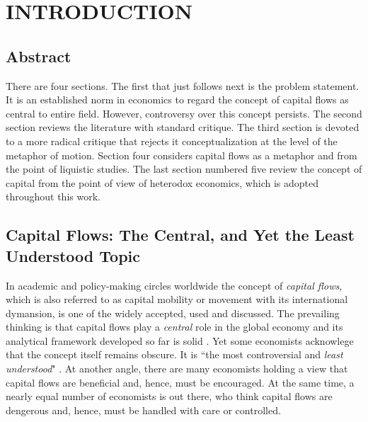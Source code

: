 \newpage

\section{\uppercase{Introduction}}\label{sec:intro}

\subsection*{Abstract}

There are four sections. The first that just follows next is the problem statement. It is an established norm in economics to regard the concept of capital flows as central to entire field. However, controversy over this concept persists. The second section reviews the literature with standard critique. The third section is devoted to a more radical critique that rejects it conceptualization at the level of the metaphor of motion. Section four considers capital flows as a metaphor and from the point of liquistic studies. The last section numbered five review the concept of capital from the point of view of heterodox economics, which is adopted throughout this work.      

\subsection{Capital Flows: The Central, and Yet the Least Understood Topic}

In academic and policy-making circles worldwide the concept of \textit{capital flows}, which is also referred to as capital mobility or movement with its international dymansion, is one of the widely accepted, used and discussed. The prevailing thinking is that capital flows play a \textit{central} role in the global economy and its analytical framework developed so far is solid \citep{koepke2019}. Yet some economists acknowlege that the concept itself remains obscure. It is ``the most controversial and \textit{least understood}" \citep{eichengreen2001}. At another angle, there are many economists holding a view that capital flows are beneficial and, hence, must be encouraged. At the same time, a nearly equal number of economists is out there, who think capital flows are dengerous and, hence, must be handled with care or controlled.  

